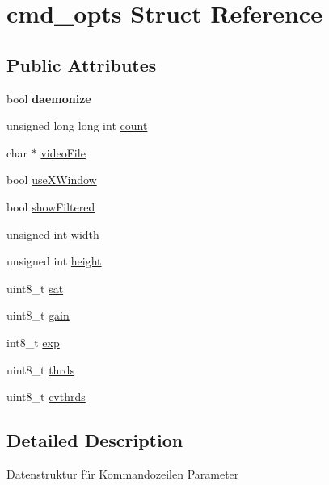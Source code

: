 \hypertarget{structcmd__opts}{\section{cmd\+\_\+opts Struct Reference}
\label{structcmd__opts}
}
\subsection*{Public Attributes}
\begin{DoxyCompactItemize}
\item 
\hypertarget{structcmd__opts_a0e94dcdbf5c755d97477c346ece96a2e}{bool {\bfseries daemonize}}\label{structcmd__opts_a0e94dcdbf5c755d97477c346ece96a2e}

\item 
unsigned long long int \hyperlink{structcmd__opts_a582f29b5e8c3328779e88bcb22ff3c2e}{count}
\item 
char $\ast$ \hyperlink{structcmd__opts_acee5a1c6793898bbda38d6d7fb5de431}{video\+File}
\item 
bool \hyperlink{structcmd__opts_aee44e8161de659e8fff50e09100f9ada}{use\+X\+Window}
\item 
bool \hyperlink{structcmd__opts_ab2a0a976837dc40909f765546c60c4c9}{show\+Filtered}
\item 
unsigned int \hyperlink{structcmd__opts_a0f13b6290e7e33c22a258c11ed23f72f}{width}
\item 
unsigned int \hyperlink{structcmd__opts_a0ab9c9cf886559f8cf19dd2f7be072fb}{height}
\item 
uint8\+\_\+t \hyperlink{structcmd__opts_aa83f2910f6a1803ee8c9f9e3581db314}{sat}
\item 
uint8\+\_\+t \hyperlink{structcmd__opts_a55323cae5dfbafe672e6581da99985b9}{gain}
\item 
int8\+\_\+t \hyperlink{structcmd__opts_aa6ef1ebf0fbaa8bd7016a8ef1a2c5ef4}{exp}
\item 
uint8\+\_\+t \hyperlink{structcmd__opts_a7518cdbdbc6ed1b8cc404aa675f383a6}{thrds}
\item 
uint8\+\_\+t \hyperlink{structcmd__opts_a6d2fcb749257ff950fabdb000999d7f9}{cvthrds}
\end{DoxyCompactItemize}


\subsection{Detailed Description}
Datenstruktur für Kommandozeilen Parameter 

